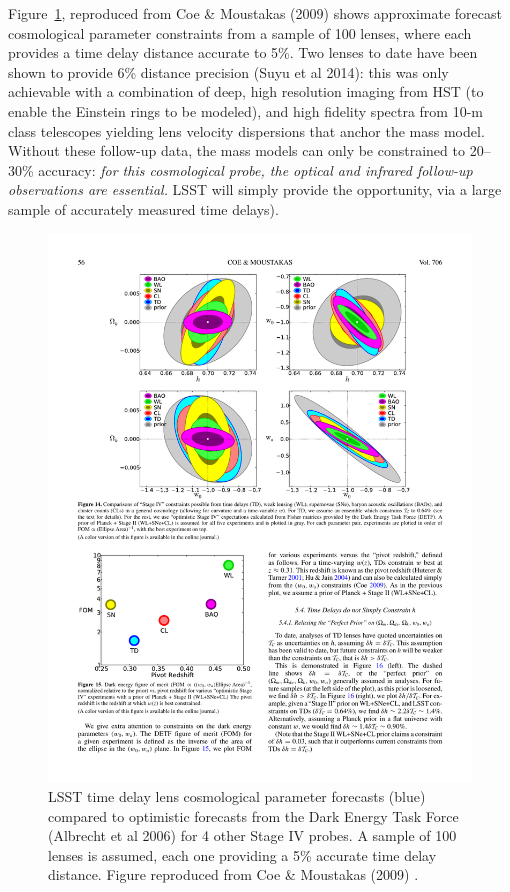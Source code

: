 Figure~\ref{fig:sl_forecast}, reproduced from Coe \& Moustakas (2009) \cite{Coe+Moustakas2009}
shows approximate forecast cosmological  parameter constraints from a
sample of 100 lenses, where each provides a  time delay distance
accurate to 5\%. Two lenses to date have been  shown to provide 6\%
distance precision (Suyu et al 2014): this was only  achievable with a
combination of deep, high resolution imaging from HST (to enable the
Einstein rings to be modeled), and high fidelity spectra from 10-m class
telescopes yielding lens velocity dispersions that anchor the mass
model. Without these follow-up data, the mass models can only be
constrained to 20--30\% accuracy: {\it for this cosmological probe, the
optical and infrared follow-up observations are essential.} LSST will
simply provide the opportunity, via a large sample of accurately
measured time delays).

\begin{figure}[!t]
    \centering\includegraphics[width=0.9\linewidth]{figs/Coe+Moustakas2009_Figure14.pdf}
    \caption{LSST time delay lens cosmological parameter forecasts (blue)
    compared to optimistic forecasts from the Dark
    Energy Task Force (Albrecht et al 2006) for 4 other Stage IV probes.
    A sample of 100 lenses is assumed, each one
    providing a 5\% accurate time delay distance. Figure reproduced from
    Coe \& Moustakas (2009) \citet{Coe+Moustakas2009}.}
    \label{fig:sl_forecast}
\end{figure}

